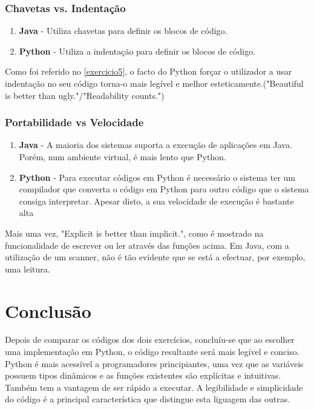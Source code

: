 \documentclass[a4paper]{report}
\begin{document}
\subsection{Chavetas vs. Indentação}
\begin{enumerate}
    \item \textbf{Java} - Utiliza chavetas para definir os blocos de código.
    \item \textbf{Python} - Utiliza a indentação para definir os blocos de código.
\end{enumerate}
Como foi referido no \autoref{exercicio5}, o facto do Python forçar o utilizador a usar indentação no seu código torna-o mais legível e melhor esteticamente.("\gls{Beautiful is better than ugly}."/"\gls{Readability counts}.")
\clearpage
\subsection{Portabilidade vs Velocidade}
\begin{enumerate}
    \item \textbf{Java} - A maioria dos sistemas suporta a execução de aplicações em Java. Porém, num ambiente virtual, é mais lento que Python.
    \item \textbf{Python} - Para executar códigos em Python é necessário o sistema ter um compilador que converta o código em Python para outro código que o sistema consiga interpretar. Apesar disto, a sua velocidade de execução é bastante alta
\end{enumerate}


Mais uma vez, "\gls{Explicit is better than implicit}.", como é mostrado na funcionalidade de escrever ou ler através das funções acima. Em Java, com a utilização de um scanner, não é tão evidente que se está a efectuar, por exemplo, uma leitura.



\chapter{Conclusão}
\label{conclusion}


Depois de comparar os códigos dos dois exercícios, concluíu-se que ao escolher uma implementação em Python, o código resultante será mais legível e conciso.
\\
Python é mais acessível a programadores principiantes, uma vez que as variáveis possuem tipos dinâmicos e as funções existentes são explícitas e intuitivas. 
\\
Também tem a vantagem de ser rápido a executar. A legibilidade e simplicidade do código é a principal característica que distingue esta liguagem das outras.
\end{document}
